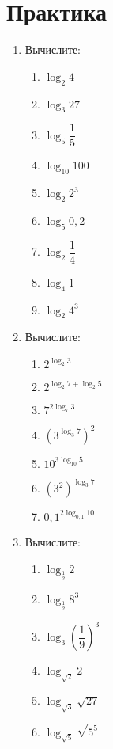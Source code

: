 \documentclass[12pt, a4paper]{article}
\begin{document}
\section{Практика}
\begin{enumerate}
	\item Вычислите:
	\begin{multicols}{3}
		\begin{enumerate}[label=\asbuk*)]
			\item $\log_2 4$
			\item $\log_3 27$
			\item $\log_5 \dfrac{1}{5}$
			\item $\log_{10} 100$
			\item $\log_2 2^3$
			\item $\log_5 0,2$
			\item $\log_2 \dfrac{1}{4}$
			\item $\log_4 1$
			\item $\log_2 4^3$
		\end{enumerate}
	\end{multicols}
	\item Вычислите:
	\begin{multicols}{3}
		\begin{enumerate}[label=\asbuk*)]
			\item $2^{\log_2 3}$
			\item $2^{\log_2 7+\log_2 5}$
			\item $7^{2\log_7 3}$
			\item $(3^{\log_3 7})^2$
			\item $10^{3\log_{10} 5}$
			\item $(3^2)^{\log_3 7}$
			\item $0,1^{2\log_{0,1} 10}$
		\end{enumerate}
	\end{multicols}
	\item Вычислите:
	\begin{multicols}{3}
		\begin{enumerate}[label=\asbuk*)]
			\item $\log_{\frac{1}{2}}2$
			\item $\log_{\frac{1}{2}}8^3$
			\item $\log_3 \left(\dfrac{1}{9}\right)^3$
			\item $\log_{\sqrt{2}}2$
			\item $\log_{\sqrt{3}}\sqrt{27}$
			\item $\log_{\sqrt{5}}\sqrt{5^5}$
		\end{enumerate}

\end{multicols}
\end{enumerate}
\end{document}
